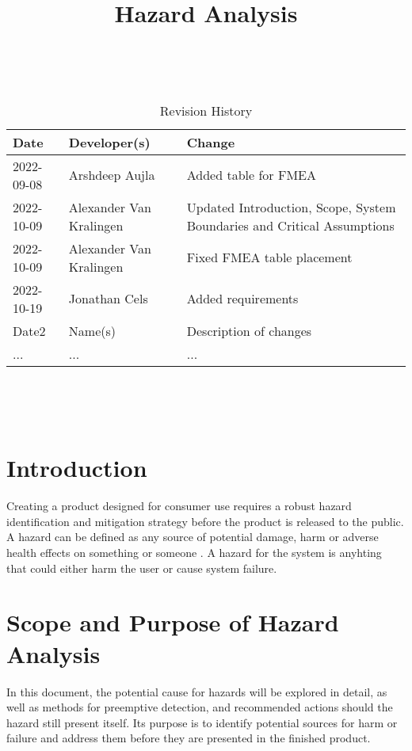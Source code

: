 \documentclass{article}
\title{Hazard Analysis\\\progname}
\author{\authname}
\date{}
\begin{document}
\maketitle
\thispagestyle{empty}

~\newpage


\begin{table}[hp]
\caption{Revision History} \label{TblRevisionHistory}
\begin{tabularx}{\textwidth}{llX}
\toprule
\textbf{Date} & \textbf{Developer(s)} & \textbf{Change}\\
\midrule
2022-09-08 & Arshdeep Aujla & Added table for FMEA\\
2022-10-09 & Alexander Van Kralingen & Updated Introduction, Scope, System Boundaries and Critical Assumptions\\
2022-10-09 & Alexander Van Kralingen & Fixed FMEA table placement\\
2022-10-19 & Jonathan Cels & Added requirements\\
Date2 & Name(s) & Description of changes\\
... & ... & ...\\
\bottomrule
\end{tabularx}
\end{table}

~\newpage

\tableofcontents

~\newpage



\section{Introduction}{
    Creating a product designed for consumer use requires a robust hazard identification and mitigation strategy before the product is released to the public. A hazard can be defined as any source of potential damage, harm or adverse health effects on something or someone \cite{CCOHS}. A hazard for the \progname{} system is anyhting that could either harm the user or cause system failure.
}

\section{Scope and Purpose of Hazard Analysis}{
    In this document, the potential cause for hazards will be explored in detail, as well as methods for preemptive detection, and recommended actions should the hazard still present itself. Its purpose is to identify potential sources for harm or failure and address them before they are presented in the finished product.
}
\end{document}
